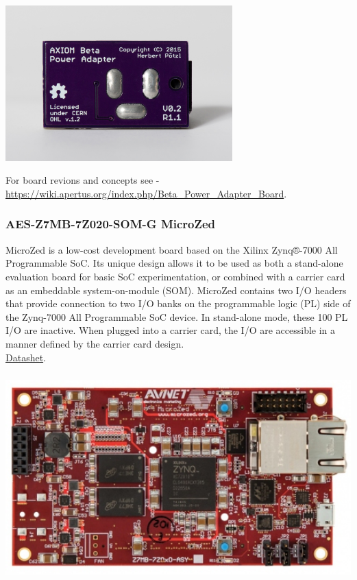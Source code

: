 \begin{center}
\includegraphics[height=6cm]{images/Power-adapter-01}
\end{center}

For board revions and concepts see - \href{https://wiki.apertus.org/index.php/Beta_Power_Adapter_Board}{https://wiki.apertus.org/index.php/Beta_Power_Adapter_Board}.\\







\subsubsection{AES-Z7MB-7Z020-SOM-G MicroZed}

MicroZed is a low-cost development board based on the Xilinx Zynq®-7000 All Programmable SoC. Its unique design allows it to be used as both a stand-alone evaluation board for basic SoC experimentation, or combined with a carrier card as an embeddable system-on-module (SOM). MicroZed contains two I/O headers that provide connection to two I/O banks on the programmable logic (PL) side of the Zynq-7000 All Programmable SoC device. In stand-alone mode, these 100 PL I/O are inactive. When plugged into a carrier card, the I/O are accessible in a manner defined by the carrier card design.\\

\href{https://wiki.apertus.org/index.php/File:AES-Z7MB-7Z020-SOM-G_MicroZed_Datasheet.pdf}{Datashet}.\\


\begin{center}
\includegraphics[height=8cm]{images/MicroZed}
\end{center}


